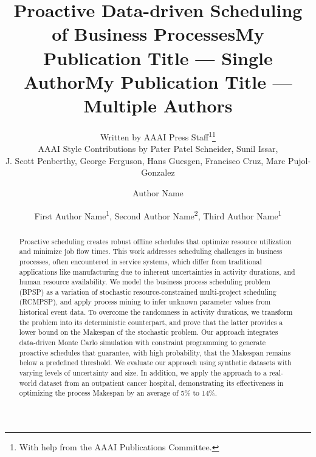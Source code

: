 \documentclass[letterpaper]{article} %
\title{Proactive Data-driven Scheduling of Business Processes}%
\author{
    Written by AAAI Press Staff\textsuperscript{\rm 1}\thanks{With help from the AAAI Publications Committee.}\\
    AAAI Style Contributions by Pater Patel Schneider,
    Sunil Issar,\\
    J. Scott Penberthy,
    George Ferguson,
    Hans Guesgen,
    Francisco Cruz\equalcontrib,
    Marc Pujol-Gonzalez\equalcontrib
}
\title{My Publication Title --- Single Author}
\author {
    Author Name
}
\title{My Publication Title --- Multiple Authors}
\author {
    First Author Name\textsuperscript{\rm 1},
    Second Author Name\textsuperscript{\rm 2},
    Third Author Name\textsuperscript{\rm 1}
}
\newcommand\btext[1]{{\color{blue}{#1}}}
\begin{document}
\maketitle

\begin{abstract}
Proactive scheduling creates 
robust offline schedules 
that optimize resource utilization and minimize job flow times. 
This work addresses scheduling challenges in business processes, often
encountered in service systems, 
which differ from traditional applications like manufacturing due to inherent uncertainties in activity durations, and human resource availability.
We model the business process scheduling 
problem (BPSP) as a variation of stochastic
resource-constrained multi-project scheduling (RCMPSP), and 
apply process mining to infer unknown
parameter values from historical event data. To overcome 
the randomness in activity durations, we transform 
the problem into its deterministic counterpart, and 
prove that the latter provides a lower bound on the
Makespan of the stochastic problem. Our approach integrates data-driven Monte Carlo simulation with constraint programming to generate proactive schedules that guarantee, with
high probability, that 
the Makespan remains below a predefined threshold.
We evaluate our approach using synthetic datasets with varying levels of uncertainty and size.
In addition, we apply the approach to a real-world dataset from an outpatient cancer hospital, demonstrating its effectiveness in optimizing the process Makespan by an average of 5\% to 14\%.




\end{abstract}




\end{document}
